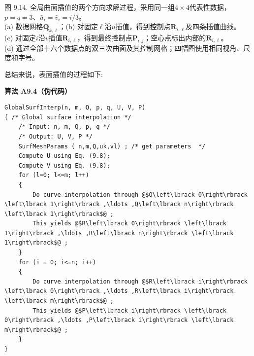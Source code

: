 \documentclass[../main.tex]{subfiles}
\begin{document}
\begin{center}
\begin{minipage}{37cm}
\vspace*{.6\baselineskip}
\centering
{}
\par\smallskip
\begin{minipage}{18cm}\centering
{}
\end{minipage}\hfill
\begin{minipage}{18cm}\centering
{}
\end{minipage}
\par\smallskip
图 9.14. 全局曲面插值的两个方向求解过程，采用同一组$4\times4$代表性数据，$p=q=3$、$\bar u_i=\bar v_i=i/3$。\\
(a) 数据网格$\mathbf Q_{k,\ell}$；(b) 对固定$\ell$沿$u$插值，得到控制点$\mathbf R_{i,\ell}$及四条插值曲线。\\
(c) 对固定$i$沿$v$插值$\mathbf R_{i,\ell}$，得到最终控制点$\mathbf P_{i,j}$；空心点标出内部的$\mathbf R_{i,\ell}$。\\
(d) 通过全部十六个数据点的双三次曲面及其控制网格；四幅图使用相同视角、尺度和字号。
\end{minipage}
\end{center}

总结来说，表面插值的过程如下:

\par\medskip\noindent\textbf{算法 A9.4（伪代码）}\par
\begin{verbatim}
GlobalSurfInterp(n, m, Q, p, q, U, V, P)
{ /* Global surface interpolation */
    /* Input: n, m, Q, p, q */
    /* Output: U, V, P */
    SurfMeshParams ( n,m,Q,uk,vl) ; /* get parameters  */
    Compute U using Eq. (9.8);
    Compute V using Eq. (9.8);
    for (l=0; l<=m; l++)
    {
        Do curve interpolation through @$Q\left\lbrack 0\right\rbrack \left\lbrack 1\right\rbrack ,\ldots ,Q\left\lbrack n\right\rbrack \left\lbrack 1\right\rbrack$@ ;
        This yields @$R\left\lbrack 0\right\rbrack \left\lbrack 1\right\rbrack ,\ldots ,R\left\lbrack n\right\rbrack \left\lbrack 1\right\rbrack$@ ;
    }
    for (i = 0; i<=n; i++)
    {
        Do curve interpolation through @$R\left\lbrack i\right\rbrack \left\lbrack 0\right\rbrack ,\ldots ,R\left\lbrack i\right\rbrack \left\lbrack m\right\rbrack$@ ;
        This yields @$P\left\lbrack i\right\rbrack \left\lbrack 0\right\rbrack ,\ldots ,P\left\lbrack i\right\rbrack \left\lbrack m\right\rbrack$@ ;
    }
}
\end{verbatim}
\end{document}
